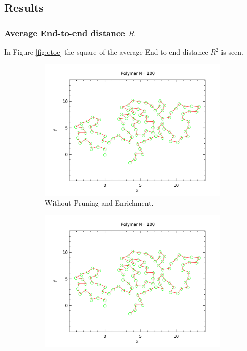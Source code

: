 \subsection*{Results}
\subsubsection*{Average End-to-end distance $R$}

In Figure \ref{fig:etoe} the square of the average End-to-end distance $R^2$ is seen.

\begin{figure}[htb]
        \centering
        \begin{subfigure}[b]{0.45\textwidth}
                \centering
                \includegraphics[width=\textwidth]{voorblad.pdf}
                \caption{Without Pruning and Enrichment.}
                \label{fig:etoe_noprem}
        \end{subfigure}
	\quad
        \begin{subfigure}[b]{0.45\textwidth}
                \centering
                \includegraphics[width=\textwidth]{voorblad.pdf}

\end{subfigure}
\end{figure}
